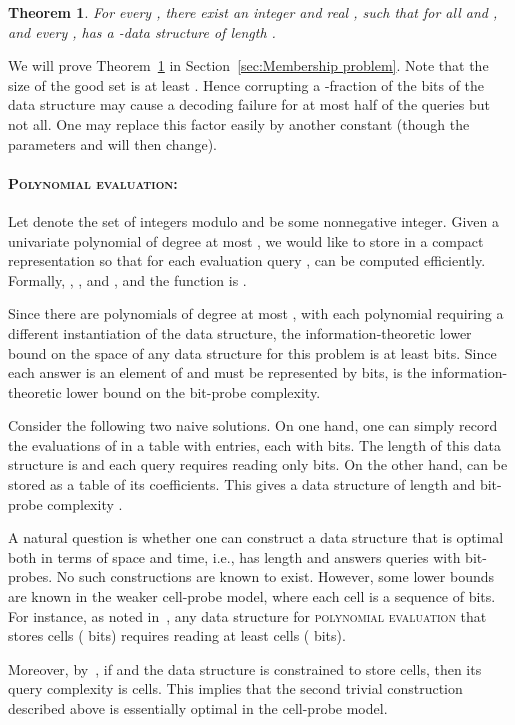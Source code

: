 \documentclass[11pt,english]{article}
\newcommand{\noun}[1]{\textsc{#1}}
\newtheorem{theorem}{Theorem}
\theoremstyle{definition}
\theoremstyle{remark}
\begin{document}
\begin{theorem}\label{thm:membership} For every ,
there exist an integer  and real , such that for
all  and , and every ,  has
a -data structure of length .
\end{theorem}

We will prove Theorem~\ref{thm:membership} in Section~\ref{sec:Membership problem}.
Note that the size of the good set  is at least .
Hence corrupting a -fraction of the bits of the data structure
may cause a decoding failure for at most half of the queries 
but not all. One may replace this factor  easily by
another constant (though the parameters  and  will then
change).


\paragraph{\bf{\noun{Polynomial evaluation:}}}

Let  denote the set of integers modulo  and 
be some nonnegative integer. Given a univariate polynomial 
of degree at most , we would like to store  in a compact representation
so that for each evaluation query ,  can be computed
efficiently. Formally, , ,
and , and the function is .

Since there are  polynomials of degree at most , with
each polynomial requiring a different instantiation of the data structure,
the information-theoretic lower bound on the space of any data structure
for this problem is at least 
bits. Since each answer is an element of  and must be
represented by  bits, 
is the information-theoretic lower bound on the bit-probe complexity.

Consider the following two naive solutions. On one hand, one can simply
record the evaluations of  in a table with  entries, each
with  bits. The length of this
data structure is  and each query requires reading only
 bits. On the other hand, 
 can be stored as a table of its  coefficients. This gives a data structure of
length and bit-probe complexity . 

A natural question is whether one can construct a data structure that
is optimal both in terms of space and time, i.e., has length 
and answers queries with  bit-probes. No such constructions
are known to exist. However, some lower bounds are known in the weaker
cell-probe model, where each cell is a sequence of 
bits. For instance, as noted in~\cite{miltersen:cellprobesurvey},
any data structure for  \noun{polynomial evaluation} that stores 
cells ( bits) requires reading at least 
cells ( bits). \begin{comment}
info above from Miltersen survey pg 17 para 2
\end{comment}
 Moreover, by~\cite{miltersen95polyeval}, if 
and the data structure is constrained to store  cells,
then its query complexity is  cells. This implies that
the second trivial construction described above is essentially optimal in the cell-probe model.
\end{document}
